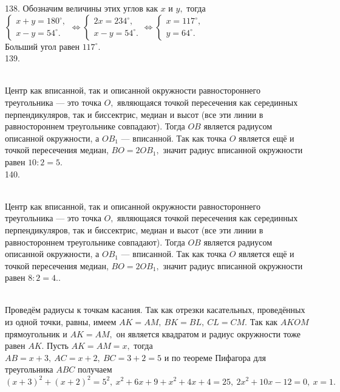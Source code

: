 138. Обозначим величины этих углов как $x$ и $y,$ тогда $\begin{cases} x+y=180^\circ,\\x-y=54^\circ.\end{cases}\Leftrightarrow
\begin{cases} 2x=234^\circ,\\x-y=54^\circ.\end{cases}\Leftrightarrow\begin{cases} x=117^\circ,\\y=64^\circ.\end{cases}$\\
Больший угол равен $117^\circ.$\\
139. \begin{figure}[ht!]
\end{figure}\\
Центр как вписанной, так и описанной окружности равностороннего треугольника --- это точка $O,$ являющаяся точкой пересечения как серединных перпендикуляров, так и биссектрис, медиан и высот (все эти линии в равностороннем треугольнике совпадают). Тогда $OB$ является радиусом описанной окружности, а $OB_1$ --- вписанной. Так как точка $O$ является ещё и точкой пересечения медиан, $BO=2OB_1,$ значит радиус вписанной окружности равен $10:2=5.$\\
140. \begin{figure}[ht!]
\end{figure}\\
Центр как вписанной, так и описанной окружности равностороннего треугольника --- это точка $O,$ являющаяся точкой пересечения как серединных перпендикуляров, так и биссектрис, медиан и высот (все эти линии в равностороннем треугольнике совпадают). Тогда $OB$ является радиусом описанной окружности, а $OB_1$ --- вписанной. Так как точка $O$ является ещё и точкой пересечения медиан, $BO=2OB_1,$ значит радиус вписанной окружности равен $8:2=4.$\newpage{}. \begin{figure}[ht!]
\end{figure}\\
Проведём радиусы к точкам касания. Так как отрезки касательных, проведённых из одной точки, равны, имеем $AK=AM,\ BK=BL,\ CL=CM.$ Так как $AKOM$ прямоугольник и $AK=AM,$ он является квадратом и радиус окружности тоже равен $AK.$ Пусть $AK=AM=x,$ тогда $AB=x+3,\ AC=x+2,\ BC=3+2=5$ и по теореме Пифагора для треугольника $ABC$ получаем $(x+3)^2+(x+2)^2=5^2,\ x^2+6x+9+x^2+4x+4=25,\ 2x^2+10x-12=0,\ x=1.$\\
